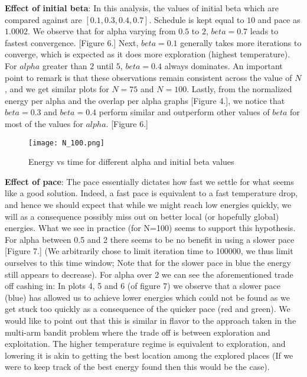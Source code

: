 \documentclass[a4paper]{article}
\begin{document}
\textbf{Effect of initial beta}:  In this analysis, the values of initial beta which are compared against are $[0.1, 0.3, 0.4, 0.7]$.  Schedule is kept equal to $10$ and pace as $1.0002$. We observe that for alpha varying from $0.5$ to $2$, $beta=0.7$ leads to fastest convergence. [Figure 6.] Next, $beta=0.1$ generally takes more iterations to converge, which is expected as it does more exploration (highest temperature). For $alpha$ greater than $2$ until $5$, $beta=0.4$ always dominates. An important point to remark is that these observations remain consistent across the value of $N$, and we get similar plots for $N=75$ and $N=100$. Lastly, from the normalized energy per alpha and the overlap per alpha graphs [Figure 4.], we notice that $beta=0.3$ and $beta=0.4$ perform similar and outperform other values of $beta$ for most of the values for $alpha$. [Figure 6.]\\
\vspace{0.5cm}
\begin{figure}[H]
\centering
\texttt{[image: N\_100.png]}
\caption{\label{fig:part1}Energy vs time for different alpha and initial beta values}
\end{figure}
\newpage
\textbf{Effect of pace}: The pace essentially dictates how fast we settle for what seems like a good solution. Indeed, a fast pace is equivalent to a fast temperature drop, and hence we should expect that while we might reach low energies quickly, we will as a consequence possibly miss out on better local (or hopefully global) energies. What we see in practice (for N=100) seems to support this hypothesis. For alpha between 0.5 and 2 there seems to be no benefit in using a slower pace [Figure 7.] (We arbitrarily chose to limit iteration time to 100000, we thus limit ourselves to this time window; Note that for the slower pace in blue the energy still appears to decrease). For alpha over 2 we can see the aforementioned trade off cashing in: In plots 4, 5 and 6 (of figure 7) we observe that a slower pace (blue) has allowed us to achieve lower energies which could not be found as we get stuck too quickly as a consequence of the quicker pace (red and green). We would like to point out that this is similar in flavor to the approach taken in the multi-arm bandit problem where the trade off is between exploration and exploitation. The higher temperature regime is equivalent to exploration, and lowering it is akin to getting the best location among the explored places (If we were to keep track of the best energy found then this would be the case).
\end{document}
